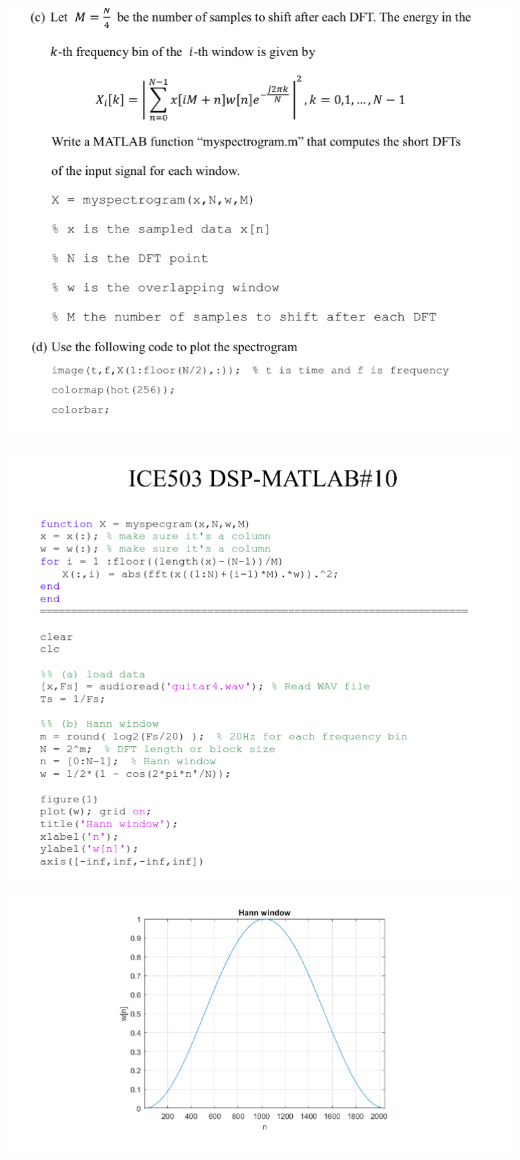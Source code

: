 \documentclass[a4paper]{article}
\begin{document}
	
	\begin{center}
		\includegraphics[width=1\linewidth]{screenshot101}
	\end{center}
	\begin{center}
		\includegraphics[width=1\linewidth]{screenshot102}
	\end{center}
	
	
	
	\begin{center}
		\includegraphics[width=1\linewidth]{screenshot103}
	\end{center}
	
\end{document}
